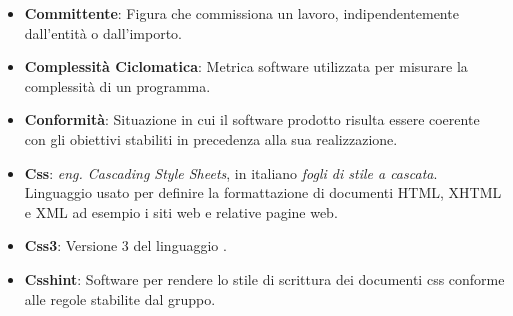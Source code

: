 \begin{itemize}
	\item
	\textbf{Committente}: Figura che commissiona un lavoro, indipendentemente dall'entità o dall'importo.
	\item
	\textbf{Complessità Ciclomatica}: Metrica software utilizzata per misurare la complessità di un programma.
	\item
	\textbf{Conformità}: Situazione in cui il software prodotto risulta essere coerente con gli obiettivi stabiliti in precedenza alla sua realizzazione.
	\item
	\textbf{Css}: \textit{eng. Cascading Style Sheets}, in italiano \textit{fogli di stile a cascata}. Linguaggio usato per definire la formattazione di documenti HTML, XHTML e XML ad esempio i siti web e relative pagine web.
	\item
	\textbf{Css3}: Versione 3 del linguaggio .
	\item
	\textbf{Csshint}: Software per rendere lo stile di scrittura dei documenti css conforme alle regole stabilite dal gruppo.
\end{itemize}
\newpage